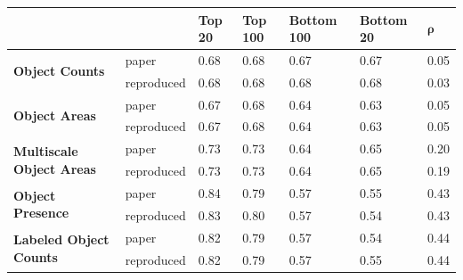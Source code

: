 \documentclass[10pt,twocolumn,letterpaper]{article}
\begin{document}
\begingroup
\setlength{\tabcolsep}{5pt}
\renewcommand{\arraystretch}{1.5}
\begin{table}[tb]
\centering
\begin{tabular}{|l||l|l|l|l|l|l|}
\hline
                                                          &            & \textbf{Top 20} & \textbf{Top 100} & \textbf{Bottom 100} & \textbf{Bottom 20} & $\bm{\rho}$ \\ \hline \hline
\multirow{2}{*}{\textbf{Object Counts}}                   & paper      & 0.68            & 0.68             & 0.67                & 0.67               & 0.05       \\ \cline{2-7} 
                                                          & reproduced & 0.68            & 0.68             & 0.68                & 0.68               & 0.03       \\ \hline \hline
\multirow{2}{*}{\textbf{Object Areas}}                    & paper      & 0.67            & 0.68             & 0.64                & 0.63               & 0.05       \\ \cline{2-7} 
                                                          & reproduced & 0.67            & 0.68             & 0.64                & 0.63               & 0.05       \\ \hline \hline
\multirow{2}{*}{\textbf{Multiscale Object Areas}}              & paper      & 0.73            & 0.73             & 0.64                & 0.65               & 0.20       \\ \cline{2-7} 
                                                          & reproduced & 0.73            & 0.73             & 0.64                & 0.65               & 0.19       \\ \hline \hline
\multirow{2}{*}{\textbf{Object Presence}}                 & paper      & 0.84            & 0.79             & 0.57                & 0.55               & 0.43       \\ \cline{2-7} 
                                                          & reproduced & 0.83            & 0.80             & 0.57                & 0.54               & 0.43       \\ \hline \hline
\multirow{2}{*}{\textbf{Labeled Object Counts}}           & paper      & 0.82            & 0.79             & 0.57                & 0.54               & 0.44       \\ \cline{2-7} 
                                                          & reproduced & 0.82            & 0.79             & 0.57                & 0.55               & 0.44       \\ \hline \hline

\end{tabular}
\end{table}
\end{document}
